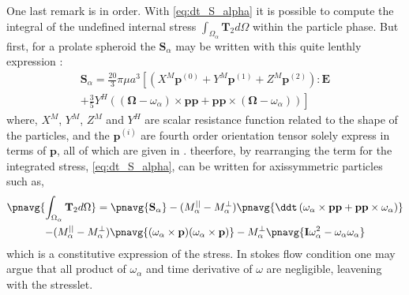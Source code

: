 One last remark is in order. 
With \ref{eq:dt_S_alpha} it is possible to compute the integral of the undefined internal stress $\int_{\Omega_\alpha} 
\mathbf{T}_2
d\Omega$ within the particle phase.
But first,  for a prolate spheroid the $\textbf{S}_\alpha$ may be written with this quite lenthly expression : 
\begin{multline}
    \textbf{S}_\alpha 
    = \frac{20}{3}\pi \mu a^3 \left[
    \left(
        X^M \mathbf{p}^{(0)}+Y^M \mathbf{p}^{(1)}+Z^M \mathbf{p}^{(2)}
    \right) : \textbf{E}\right.\\ \left.
    + \frac{3}{5} Y^H ((\mathbf{\Omega} - \omega_\alpha) \times \textbf{pp} + \textbf{pp} \times (\mathbf{\Omega} - \omega_\alpha) )
    \right]
    \label{eq:S_def}
\end{multline}
where, $X^M$, $Y^M$,  $Z^M$ and $Y^H$ are scalar resistance function related to the shape of the particles, and the $\mathbf{p}^{(i)}$ are fourth order orientation tensor solely express in terms of $\textbf{p}$, all of which are given in \citet[p 62.]{kim2013microhydrodynamics}. 
theerfore, by rearranging the term for the integrated stress, \ref{eq:dt_S_alpha}, can be written for axissymmetric particles such as, 
\begin{multline}
    \pnavg{\int_{\Omega_\alpha} 
        \mathbf{T}_2
    d\Omega}
    =  
      \pnavg{\textbf{S}_\alpha}
    - (M_\alpha^{||} - M_\alpha^\bot)\pnavg{\ddt  \left(
        \omega_\alpha \times
        \textbf{pp}
        + \textbf{pp} \times \omega_\alpha
    \right) }\\
    - (M_\alpha^{||} - M_\alpha^\bot) \pnavg{
        (\omega_\alpha \times \textbf{p}) (\omega_\alpha \times \textbf{p}) } 
    -M_\alpha^\bot \pnavg{\textbf{I} \omega_\alpha^2 -\omega_\alpha\omega_\alpha }
\end{multline}
which is a constitutive expression of the stress. 
In stokes flow condition one may argue that all product of $\omega_\alpha$ and time derivative of $\omega$ are negligible, leavening with the stresslet. 